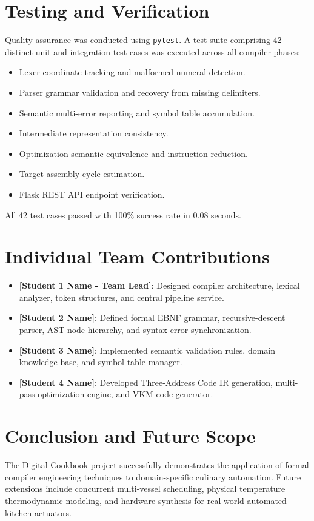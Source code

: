\documentclass[conference]{IEEEtran}
\begin{document}
\section{Testing and Verification}
Quality assurance was conducted using \texttt{pytest}. A test suite comprising 42 distinct unit and integration test cases was executed across all compiler phases:
\begin{itemize}
    \item Lexer coordinate tracking and malformed numeral detection.
    \item Parser grammar validation and recovery from missing delimiters.
    \item Semantic multi-error reporting and symbol table accumulation.
    \item Intermediate representation consistency.
    \item Optimization semantic equivalence and instruction reduction.
    \item Target assembly cycle estimation.
    \item Flask REST API endpoint verification.
\end{itemize}
All 42 test cases passed with 100\% success rate in 0.08 seconds.

\section{Individual Team Contributions}
\begin{itemize}
    \item \textbf{[Student 1 Name - Team Lead]}: Designed compiler architecture, lexical analyzer, token structures, and central pipeline service.
    \item \textbf{[Student 2 Name]}: Defined formal EBNF grammar, recursive-descent parser, AST node hierarchy, and syntax error synchronization.
    \item \textbf{[Student 3 Name]}: Implemented semantic validation rules, domain knowledge base, and symbol table manager.
    \item \textbf{[Student 4 Name]}: Developed Three-Address Code IR generation, multi-pass optimization engine, and VKM code generator.
\end{itemize}

\section{Conclusion and Future Scope}
The Digital Cookbook project successfully demonstrates the application of formal compiler engineering techniques to domain-specific culinary automation. Future extensions include concurrent multi-vessel scheduling, physical temperature thermodynamic modeling, and hardware synthesis for real-world automated kitchen actuators.
\end{document}
